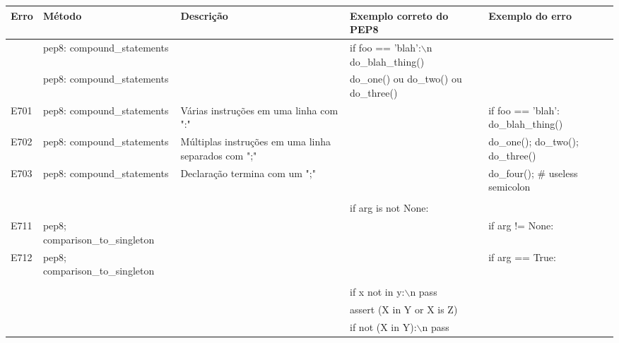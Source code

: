 	\begin{landscape}
		\begin{table}
			\scriptsize
			\begin{tabularx}{\linewidth}{ |p{1cm}|p{4cm}|p{6cm}|p{4.5cm}|X|}
				\hline
				\textbf{Erro}
				& \textbf{Método}
				& \textbf{Descrição}
				& \textbf{Exemplo correto do PEP8}
				& \textbf{Exemplo do erro} \\
				\hline
				
				& pep8: compound\_statements 
				&   
				& if foo == 'blah':$\backslash$n    do\_blah\_thing() 
				&  \\
				\hline
				
				& pep8: compound\_statements 
				&   
				& do\_one() ou do\_two() ou do\_three() 
				&  \\
				\hline
				E701 
				& pep8: compound\_statements 
				& Várias instruções em uma linha com ":" 
				&   
				& if foo == 'blah': do\_blah\_thing() \\
				\hline
				E702 
				& pep8: compound\_statements 
				& Múltiplas instruções em uma linha separados com ";" 
				&   
				& do\_one(); do\_two(); do\_three() \\
				\hline
				E703 
				& pep8: compound\_statements 
				& Declaração termina com um ";" 
				&   
				& do\_four();  \# useless semicolon \\
				\hline
				
				&   
				&   
				&   
				&  \\
				\hline
				
				&   
				&   
				& if arg is not None: 
				&  \\
				\hline
				E711 
				& pep8; comparison\_to\_singleton 
				&   
				&   
				& if arg != None: \\
				\hline
				E712 
				& pep8; comparison\_to\_singleton 
				&   
				&   
				& if arg == True: \\
				\hline
				
				&   
				&   
				&   
				&  \\
				\hline
				
				&   
				&   
				& if x not in y:$\backslash$n    pass 
				&  \\
				\hline
				
				&   
				&   
				& assert (X in Y or X is Z) 
				&  \\
				\hline
				
				&   
				&   
				& if not (X in Y):$\backslash$n    pass 
				&  \\
				\hline
				

\end{tabularx}
\end{table}
\end{landscape}
